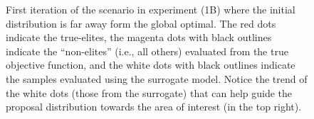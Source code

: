 \begin{figure}[!h]
  \centering
  \resizebox{0.6\columnwidth}{!}{}
  \caption{
    \label{fig:example_1b}
    First iteration of the scenario in experiment (1B) where the initial distribution is far away form the global optimal. The red dots indicate the true-elites, the magenta dots with black outlines indicate the ``non-elites'' (i.e., all others) evaluated from the true objective function, and the white dots with black outlines indicate the samples evaluated using the surrogate model. Notice the trend of the white dots (those from the surrogate) that can help guide the proposal distribution towards the area of interest (in the top right).
  }
\end{figure}
